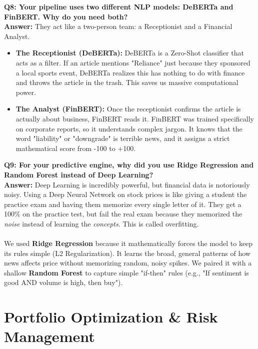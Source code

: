 \documentclass[11pt, a4paper]{article}
\begin{document}
\textbf{\textcolor{IITBlue}{Q8: Your pipeline uses two different NLP models: DeBERTa and FinBERT. Why do you need both?}} \\
\textbf{Answer:} They act like a two-person team: a Receptionist and a Financial Analyst.
\begin{itemize}
    \item \textbf{The Receptionist (DeBERTa):} DeBERTa is a Zero-Shot classifier that acts as a filter. If an article mentions "Reliance" just because they sponsored a local sports event, DeBERTa realizes this has nothing to do with finance and throws the article in the trash. This saves us massive computational power.
    \item \textbf{The Analyst (FinBERT):} Once the receptionist confirms the article is actually about business, FinBERT reads it. FinBERT was trained specifically on corporate reports, so it understands complex jargon. It knows that the word "liability" or "downgrade" is terrible news, and it assigns a strict mathematical score from -100 to +100.
\end{itemize}

\textbf{\textcolor{IITBlue}{Q9: For your predictive engine, why did you use Ridge Regression and Random Forest instead of Deep Learning?}} \\
\textbf{Answer:} Deep Learning is incredibly powerful, but financial data is notoriously noisy. Using a Deep Neural Network on stock prices is like giving a student the practice exam and having them memorize every single letter of it. They get a 100\% on the practice test, but fail the real exam because they memorized the \textit{noise} instead of learning the \textit{concepts}. This is called overfitting.
\\ \\
We used \textbf{Ridge Regression} because it mathematically forces the model to keep its rules simple (L2 Regularization). It learns the broad, general patterns of how news affects price without memorizing random, noisy spikes. We paired it with a shallow \textbf{Random Forest} to capture simple "if-then" rules (e.g., "If sentiment is good AND volume is high, then buy").

\section*{Portfolio Optimization \& Risk Management}
\end{document}
